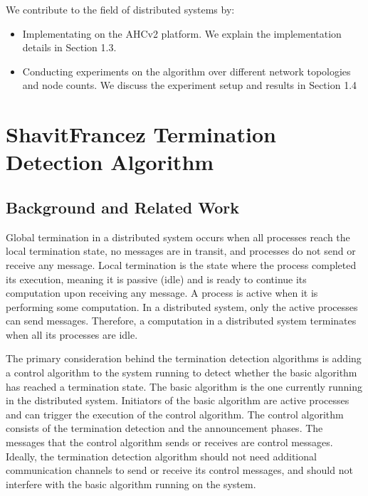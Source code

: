 \documentclass[letterpaper,10pt,english]{sphinxmanual}
\begin{document}
\sphinxAtStartPar
We contribute to the field of distributed systems by:
\begin{itemize}
\item {} 
\sphinxAtStartPar
Implementating {\hyperref[\detokenize{docs/ShavitFrancez/algorithm:shavitfrancezterminationdetectionalgorithm}]{}} on the AHCv2 platform. We explain the implementation details in Section 1.3.

\item {} 
\sphinxAtStartPar
Conducting experiments on the algorithm over different network topologies and node counts. We discuss the experiment setup and results in Section 1.4

\end{itemize}

\sphinxstepscope


\section{Shavit\sphinxhyphen{}Francez Termination Detection Algorithm}
\label{\detokenize{docs/ShavitFrancez/algorithm:shavitfrancezalg}}\label{\detokenize{docs/ShavitFrancez/algorithm::doc}}

\subsection{Background and Related Work}
\label{\detokenize{docs/ShavitFrancez/algorithm:background-and-related-work}}
\sphinxAtStartPar
Global termination in a distributed system occurs when all processes reach the local termination state, no messages are in transit, and processes do not send or receive any message. Local termination is the state where the process completed its execution, meaning it is passive (idle) and is ready to continue its computation upon receiving any message. A process is active when it is performing some computation. In a distributed system, only the active processes can send messages. Therefore, a computation in a distributed system terminates when all its processes are idle.

\sphinxAtStartPar
The primary consideration behind the termination detection algorithms is adding a control algorithm to the system running to detect whether the basic algorithm has reached a termination state. The basic algorithm is the one currently running in the distributed system. Initiators of the basic algorithm are active processes and can trigger the execution of the control algorithm. The control algorithm consists of the termination detection and the announcement phases. The messages that the control algorithm sends or receives are control messages. Ideally, the termination detection algorithm should not need additional communication channels to send or receive its control messages, and should not interfere with the basic algorithm running on the system.
\end{document}
